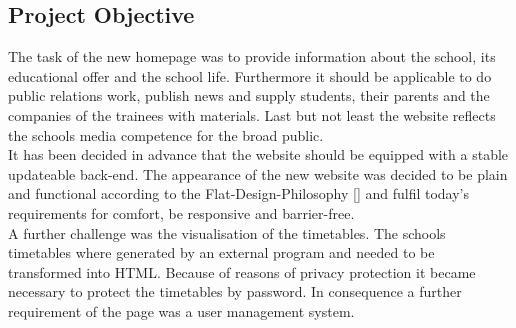 \subsection{Project Objective}
\label{sec:ProjectObjective}
The task of the new homepage was to provide information about the school, its  educational offer and the school life. 
Furthermore it should be applicable to do public relations work, publish news and supply students, 
their parents and the companies of the trainees with materials. Last but not least the website reflects 
the schools media competence for the broad public.\\
It has been decided in advance that the website should be equipped with a stable updateable back-end. 
The appearance of the new website was decided to be plain and functional according to the Flat-Design-Philosophy [\cite{Wik1}]
and fulfil today's requirements for comfort, be responsive and barrier-free.\\
A further challenge was the visualisation of the timetables. The schools timetables where 
generated by an external program and needed to be transformed into \acs{HTML}.
Because of reasons of privacy protection it became necessary to protect the timetables by password. 
In consequence a further requirement of the page was a user management system.